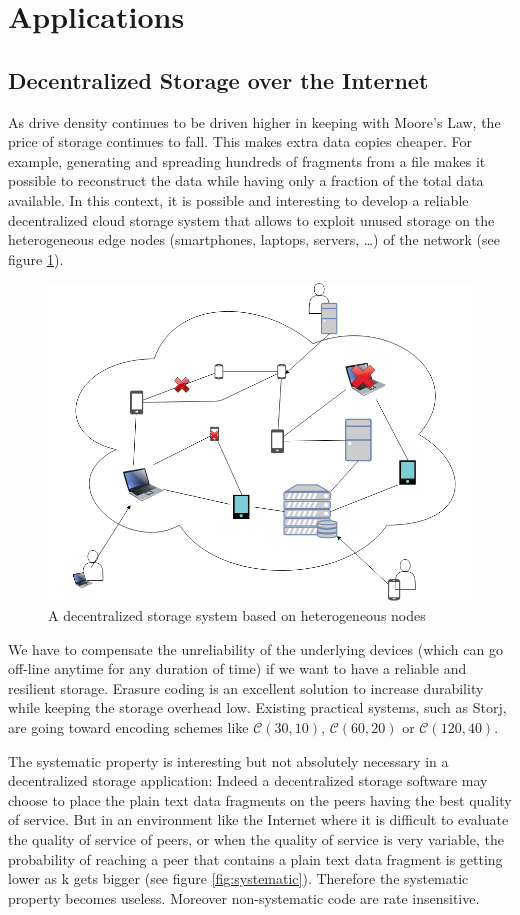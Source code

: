 \documentclass[oneside,9pt]{article}
\newcommand{\ec}[2]{ \mathcal{C}(#1, #2) }
\begin{document}
\section{Applications}

\subsection{Decentralized Storage over the Internet}

As drive density continues to be driven higher in keeping with Moore's Law, the price of storage continues to fall. This makes extra data copies cheaper. For example, generating and spreading hundreds of fragments from a file makes it possible to reconstruct the data while having only a fraction of the total data available. In this context, it is possible and interesting to develop a reliable decentralized cloud storage system that allows to exploit unused storage on the heterogeneous edge nodes (smartphones, laptops, servers, \dots) of the network (see figure \ref{fig:network}).

\begin{figure}[!h]
\centering
\includegraphics[width=0.7\columnwidth]{network.png}
\caption{A decentralized storage system based on heterogeneous nodes}
\label{fig:network}
\end{figure}

We have to compensate the unreliability of the underlying devices (which can go off-line anytime for any duration of time) if we want to have a reliable and resilient storage. Erasure coding is an excellent solution to increase durability while keeping the storage overhead low. Existing practical systems, such as Storj, are going toward encoding schemes like $\ec{30}{10}$, $\ec{60}{20}$ or $\ec{120}{40}$.

The systematic property is interesting but not absolutely necessary in a decentralized storage application: Indeed a decentralized storage software may choose to place the plain text data fragments on the peers having the best quality of service. But in an environment like the Internet where it is difficult to evaluate the quality of service of peers, or when the quality of service is very variable, the probability of reaching a peer that contains a plain text data fragment is getting lower as k gets bigger (see figure \ref{fig:systematic}). Therefore the systematic property becomes useless. Moreover non-systematic code are rate insensitive.
\end{document}
